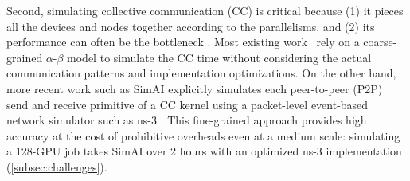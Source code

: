 



{Second}, simulating collective communication (CC) is critical because (1) it pieces all the devices and nodes together according to the parallelisms, and (2) its performance can often be the bottleneck \cite{duan2024efficient, qi2023zero, jiang2024megascale, huang2019gpipe}. 
Most existing work~\cite{duan2024proteus, won2023astra,hu2022dpro,lu2023distsim,zhu2020daydream} rely on a coarse-grained $\alpha$-$\beta$ model \cite{valiant1990bridging} to simulate the CC time without considering the actual communication patterns and implementation optimizations.
On the other hand, more recent work such as SimAI \cite{SimAI2025NSDI} explicitly simulates each peer-to-peer (P2P) send and receive primitive of a CC kernel using a packet-level event-based network simulator such as ns-3 \cite{riley2010ns}.
This fine-grained approach provides high accuracy at the cost of prohibitive overheads even at a medium scale: simulating a 128-GPU job takes SimAI over 2 hours with an optimized ns-3 implementation (\cref{subsec:challenges}). 

